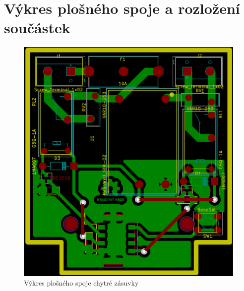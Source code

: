 \documentclass[12pt,a4paper,oneside]{article}
\begin{document}
\section{Výkres plošného spoje a rozložení součástek}

\begin{figure}[H]
\label{fig:board}
\minipage{\textwidth}
\includegraphics[width = 128mm]{img/board.pdf}
\caption{Výkres plošného spoje chytré zásuvky}
\endminipage
\end{figure}
\end{document}
